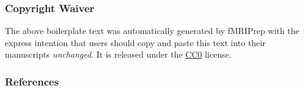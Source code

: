 \documentclass[
]{article}
\begin{document}
\subsubsection{Copyright Waiver}\label{copyright-waiver}

The above boilerplate text was automatically generated by fMRIPrep with
the express intention that users should copy and paste this text into
their manuscripts \emph{unchanged}. It is released under the
\href{https://creativecommons.org/publicdomain/zero/1.0/}{CC0} license.

\subsubsection{References}\label{references}


\end{document}
